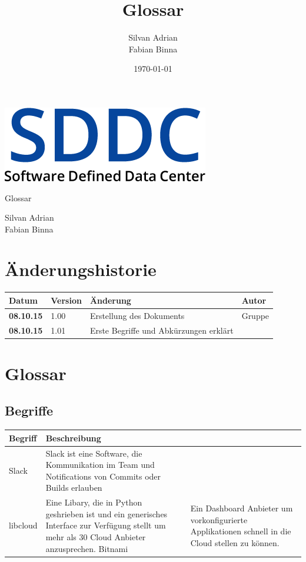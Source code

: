 \documentclass[11pt]{scrartcl}
\title{Glossar}
\author{Silvan Adrian \\ Fabian Binna}
\date{\today{}}
\begin{document}
\def\arraystretch{1.5}
\begin{titlepage}
\begin{center}
\vspace{10em}
\includegraphics[scale=2]{SDDC}
\vspace{10em}
\end{center}
\begin{center}
\huge {Glossar}
\end{center}
\begin{center}
\vspace{10em}
\LARGE {Silvan Adrian} \\
\LARGE {Fabian Binna}
\end{center}

\end{titlepage}

\newpage
\section{Änderungshistorie}
\begin{tabularx}{\linewidth}{l l X l}
\textbf{Datum} & \textbf{Version} & \textbf{Änderung}  & \textbf{Autor} \\
\hline
\textbf{08.10.15} & 1.00 & Erstellung des Dokuments & Gruppe \\
\textbf{08.10.15} & 1.01 & Erste Begriffe und Abkürzungen erklärt\\
\end{tabularx}

\newpage
\tableofcontents
\newpage

\section{Glossar}
\subsection{Begriffe}

\begin{tabularx}{\linewidth}{l | X}
    \textbf{Begriff} & \textbf{Beschreibung}\\
    \hline
     Slack &  Slack ist eine Software, die Kommunikation im Team und Notifications von 
     Commits oder Builds erlauben\\
    \hline
    libcloud & Eine Libary, die in Python geshrieben ist und ein generisches 
    Interface zur Verfügung stellt um mehr als 30 Cloud Anbieter anzusprechen.
    \hline
    Bitnami & Ein Dashboard Anbieter um vorkonfigurierte Applikationen schnell in die Cloud 
    stellen zu können.
    \hline
\end{tabularx}
\end{document}
